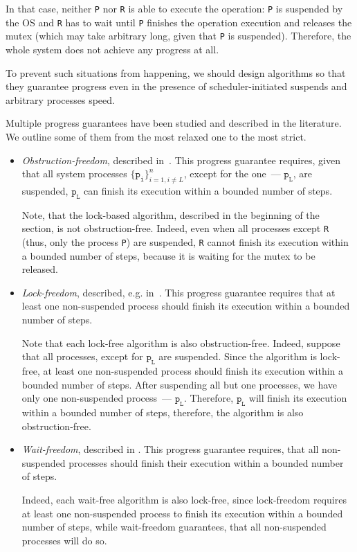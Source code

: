 \documentclass[times, dvipsnames,%
               languages={russian,english} %
              ]{itmo-student-thesis}
\begin{document}
In that case, neither \texttt{P} nor \texttt{R} is able to execute the operation: \texttt{P} is suspended by the OS and \texttt{R} has to wait until \texttt{P} finishes the operation execution and releases the mutex (which may take arbitrary long, given that \texttt{P} is suspended). Therefore, the whole system does not achieve any progress at all.

To prevent such situations from happening, we should design algorithms so that they guarantee progress even in the presence of scheduler-initiated suspends and arbitrary processes speed.

Multiple progress guarantees have been studied and described in the literature. We outline some of them from the most relaxed one to the most strict.

\begin{itemize}
    \item \emph{Obstruction-freedom}, described in~\cite{herlihy2003obstruction}. This progress guarantee requires, given that all system processes $\{\texttt{p}_{\texttt{i}}\}_{i = 1, i \neq L}^n$, except for the one~--- $\texttt{p}_{\texttt{L}}$, are suspended, $\texttt{p}_{\texttt{L}}$ can finish its execution within a bounded number of steps.
    
    Note, that the lock-based algorithm, described in the beginning of the section, is not obstruction-free. Indeed, even when all processes except \texttt{R} (thus, only the process \texttt{P}) are suspended, \texttt{R} cannot finish its execution within a bounded number of steps, because it is waiting for the mutex to be released.
    
    \item \emph{Lock-freedom}, described, e.g. in~\cite{herlihy2020art}. This progress guarantee requires that at least one non-suspended process should finish its execution within a bounded number of steps.
    
    Note that each lock-free algorithm is also obstruction-free. Indeed, suppose that all processes, except for $\texttt{p}_{\texttt{L}}$ are suspended. Since the algorithm is lock-free, at least one non-suspended process should finish its execution within a bounded number of steps. After suspending all but one processes, we have only one non-suspended process~--- $\texttt{p}_{\texttt{L}}$. Therefore, $\texttt{p}_{\texttt{L}}$ will finish its execution within a bounded number of steps, therefore, the algorithm is also obstruction-free.
    
    \item \emph{Wait-freedom}, described in \cite{herlihy1991wait}. This progress guarantee requires, that all non-suspended processes should finish their execution within a bounded number of steps.
    
    Indeed, each wait-free algorithm is also lock-free, since lock-freedom requires at least one non-suspended process to finish its execution within a bounded number of steps, while wait-freedom guarantees, that all non-suspended processes will do so.
\end{itemize}
\end{document}
